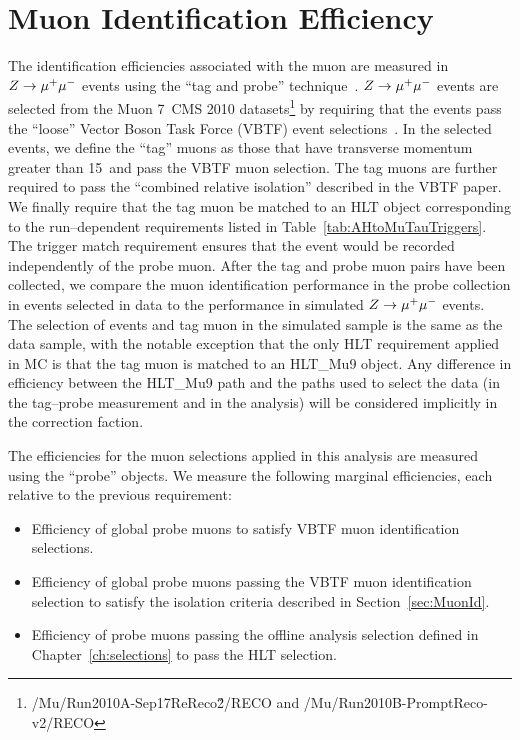 \section{Muon Identification Efficiency} \label{sec:ZmumuTagAndProbe} 
%
The identification efficiencies associated with the muon are measured in $\mbox{\ensuremath{Z\to\mu^+\mu^-}}$
events using the ``tag and probe'' technique~\cite{CMS-PAS-EWK-10-002}.  $\mbox{\ensuremath{Z\to\mu^+\mu^-}}$
events are selected from the Muon 7~\TeV CMS 2010
datasets\footnote{\mbox{/Mu/Run2010A-Sep17ReReco\v2/RECO} and
\mbox{/Mu/Run2010B-PromptReco-v2/RECO} } by requiring that the events pass the
``loose'' Vector Boson Task Force (VBTF) event
selections~\cite{CMS-PAS-EWK-10-002}.  In the selected events, we define the
``tag'' muons as those that have transverse momentum greater than 15~\GeVc and
pass the VBTF muon selection.  The tag muons are further required to pass the
``combined relative isolation'' described in the VBTF paper.  We finally require
that the tag muon be matched to an HLT object corresponding to the
run--dependent requirements listed in Table~\ref{tab:AHtoMuTauTriggers}.  The
trigger match requirement ensures that the event would be recorded independently
of the probe muon.  After the tag and probe muon pairs have been collected, we
compare the muon identification performance in the probe collection in events
selected in data to the performance in simulated $\mbox{\ensuremath{Z\to\mu^+\mu^-}}$ events.  The selection
of events and tag muon in the simulated sample is the same as the data sample,
with the notable exception that the only HLT requirement applied in MC is that
the tag muon is matched to an HLT\_Mu9 object.  Any difference in efficiency
between the HLT\_Mu9 path and the paths used to select the data (in the
tag--probe measurement and in the analysis) will be considered implicitly in the
correction faction. 

The efficiencies for the muon selections applied in this analysis are measured
using the ``probe'' objects.  We measure the following marginal efficiencies,
each relative to the previous requirement:
\begin{itemize}
\item Efficiency of global probe muons to satisfy VBTF muon identification
selections.
\item Efficiency of global probe muons passing the VBTF muon identification
selection to satisfy the isolation criteria described in
Section~\ref{sec:MuonId}.
\item Efficiency of probe muons passing the offline analysis selection defined
  in Chapter~\ref{ch:selections} to pass the HLT selection.
\end{itemize}

